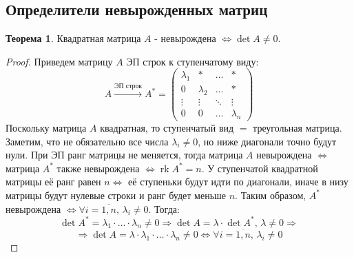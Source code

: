 \documentclass[12pt]{article}
\theoremstyle{definition}
\newtheorem{theorem}{Теорема}
\DeclareMathOperator{\rk}{\text{rk}}
\begin{document}
\subsection*{Определители невырожденных матриц}
\begin{theorem}
	Квадратная матрица $A$ - невырождена $\Leftrightarrow \det{A} \neq 0$.
\end{theorem}
\begin{proof}
	Приведем матрицу $A$ ЭП строк к ступенчатому виду:
	$$
		A \xrightarrow{\text{ЭП строк}} A^* = 		
		\begin{pmatrix}
			\lambda_1 & * & \dotsc & * \\
			0 & \lambda_2 &  \dotsc & *\\
			\vdots & \vdots & \ddots & \vdots\\
			0 & 0 & \dotsc & \lambda_n
		\end{pmatrix}
	$$
	Поскольку матрица $A$ квадратная, то ступенчатый вид $=$ треугольная матрица. Заметим, что не обязательно все числа $\lambda_i \neq 0$, но ниже диагонали точно будут нули. При ЭП ранг матрицы не меняется, тогда матрица $A$ невырождена $\Leftrightarrow$ матрица $A^*$ также невырождена $\Leftrightarrow \rk{A^*} = n$. У ступенчатой квадратной матрицы её ранг равен $n \Leftrightarrow$ её ступеньки будут идти по диагонали, иначе в низу матрицы будут нулевые строки и ранг будет меньше $n$. Таким образом, $A^*$ невырождена $\Leftrightarrow \forall i = \overline{1,n}, \, \lambda_i \neq 0$. Тогда:
	$$
		\det{A^*} = \lambda_1{\cdot}\dotsc{\cdot}\lambda_n \neq 0 \Rightarrow \det{A} = \lambda{\cdot}\det{A^*}, \, \lambda \neq 0\Rightarrow 
	$$
	$$
		\Rightarrow \det{A} = \lambda{\cdot}\lambda_1{\cdot}\dotsc{\cdot}\lambda_n \neq 0 \Leftrightarrow \forall i = \overline{1,n}, \, \lambda_i \neq 0
	$$
\end{proof}
\end{document}
